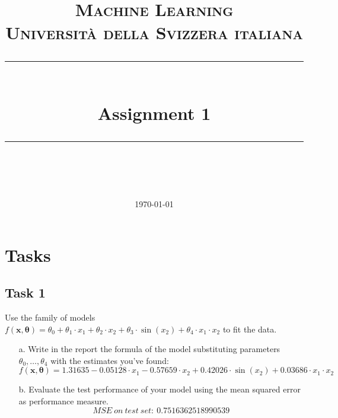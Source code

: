 \documentclass[11pt]{scrartcl}
\title{	
	\normalfont\normalsize
	\textsc{Machine Learning\\%
	Universit\`a della Svizzera italiana}\\
	\vspace{25pt}
	\rule{\linewidth}{0.5pt}\\
	\vspace{20pt}
	{\huge Assignment 1}\\
	\vspace{12pt}
	\rule{\linewidth}{1pt}\\
	\vspace{12pt}
}
\author{\LARGE \thestudent}
\date{\normalsize\today}
\begin{document}
\maketitle




\section*{Tasks}


\subsection*{Task 1}
Use the family of models $f(\mathbf{x}, \boldsymbol{\theta}) = \theta_0 + \theta_1 \cdot x_1 + \theta_2 \cdot x_2 + \theta_3 \cdot \sin(x_2) + \theta_4 \cdot x_1 \cdot x_2$ to fit the data. 

\begin{itemize}
	\item [a.] Write in the report the formula of the model substituting parameters $\theta_0, \ldots, \theta_4$ with the estimates you've found:
	$$f(\mathbf{x}, \boldsymbol{\theta}) = 1.31635 - 0.05128 \cdot x_1 - 0.57659 \cdot x_2 + 0.42026 \cdot \sin(x_2) + 0.03686 \cdot x_1 \cdot x_2$$
	\item [b.] Evaluate the test performance of your model using the mean squared error as performance measure.
    $$MSE\ on\ test\ set:\ 0.7516362518990539$$
\end{itemize}
\end{document}
